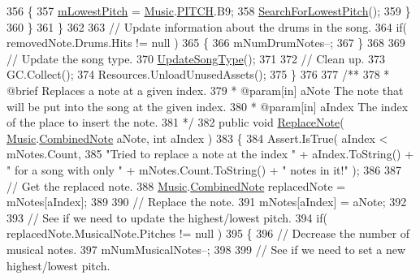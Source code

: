 \begin{DoxyCodeInclude}
356                 \{
357                     \hyperlink{group___song_priv_var_ga293976ef4c2050687a81edfbf77b4fc1}{mLowestPitch} = \hyperlink{class_music}{Music}.\hyperlink{group___music_enums_ga508f69b199ea518f935486c990edac1d}{PITCH}.B9;
358                     \hyperlink{group___song_priv_func_gac2e812c6385529eb7a9be5082c7bde75}{SearchForLowestPitch}();
359                 \}
360             \}
361         \}
362 
363         \textcolor{comment}{// Update information about the drums in the song.}
364         \textcolor{keywordflow}{if}( removedNote.Drums.Hits != null )
365         \{
366             mNumDrumNotes--;
367         \}
368 
369         \textcolor{comment}{// Update the song type.}
370         \hyperlink{group___song_priv_func_ga9a1d6eba1576c3631d3c0331196d9ae2}{UpdateSongType}();
371 
372         \textcolor{comment}{// Clean up.}
373         GC.Collect();
374         Resources.UnloadUnusedAssets();
375     \}
376 \textcolor{comment}{}
377 \textcolor{comment}{    /**}
378 \textcolor{comment}{     * @brief Replaces a note at a given index.}
379 \textcolor{comment}{     * @param[in] aNote The note that will be put into the song at the given index.}
380 \textcolor{comment}{     * @param[in] aIndex The index of the place to insert the note.}
381 \textcolor{comment}{    */}
382     \textcolor{keyword}{public} \textcolor{keywordtype}{void} \hyperlink{group___song_pub_func_ga326d61c75339080057a02c6decb0cde3}{ReplaceNote}( \hyperlink{class_music}{Music}.\hyperlink{group___music_structs_struct_music_1_1_combined_note}{CombinedNote} aNote, \textcolor{keywordtype}{int} aIndex )
383     \{
384         Assert.IsTrue( aIndex < mNotes.Count,
385              \textcolor{stringliteral}{"Tried to replace a note at the index "} + aIndex.ToString() + \textcolor{stringliteral}{" for a song with only "} + 
      mNotes.Count.ToString() + \textcolor{stringliteral}{" notes in it!"} );
386 
387         \textcolor{comment}{// Get the replaced note.}
388         \hyperlink{class_music}{Music}.\hyperlink{group___music_structs_struct_music_1_1_combined_note}{CombinedNote} replacedNote = mNotes[aIndex];
389 
390         \textcolor{comment}{// Replace the note.}
391         mNotes[aIndex] = aNote;
392 
393         \textcolor{comment}{// See if we need to update the highest/lowest pitch.}
394         \textcolor{keywordflow}{if}( replacedNote.MusicalNote.Pitches != null )
395         \{
396             \textcolor{comment}{// Decrease the number of musical notes.}
397             mNumMusicalNotes--;
398 
399             \textcolor{comment}{// See if we need to set a new highest/lowest pitch.}

\end{DoxyCodeInclude}
